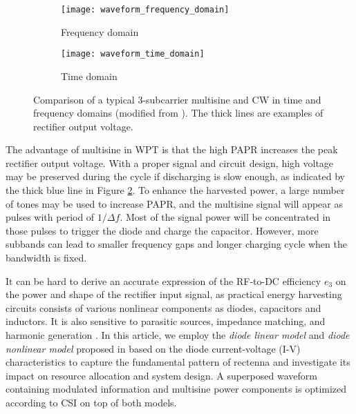 \begin{figure}
  \centering

  \begin{subfigure}{.45\textwidth}
    \centering
      \texttt{[image: waveform\_frequency\_domain]}
    \caption{Frequency domain}
    \label{fig:waveform_frequency_domain}
  \end{subfigure}
  \begin{subfigure}{.45\textwidth}
    \centering
      \texttt{[image: waveform\_time\_domain]}
    \caption{Time domain}
    \label{fig:waveform_time_domain}
  \end{subfigure}

  \caption{Comparison of a typical 3-subcarrier multisine and CW in time and frequency domains (modified from \cite{Trotter2009}). The thick lines are examples of rectifier output voltage.}
  \label{fig:waveform_comparison}
\end{figure}

The advantage of multisine in WPT is that the high PAPR increases the peak rectifier output voltage. With a proper signal and circuit design, high voltage may be preserved during the cycle if discharging is slow enough, as indicated by the thick blue line in Figure \ref{fig:waveform_time_domain}. To enhance the harvested power, a large number of tones may be used to increase PAPR, and the multisine signal will appear as pulses with period of $1/\Delta f$. Most of the signal power will be concentrated in those pulses to trigger the diode and charge the capacitor. However, more subbands can lead to smaller frequency gaps and longer charging cycle when the bandwidth is fixed.

It can be hard to derive an accurate expression of the RF-to-DC efficiency ${e_3}$ on the power and shape of the rectifier input signal, as practical energy harvesting circuits consists of various nonlinear components as diodes, capacitors and inductors. It is also sensitive to parasitic sources, impedance matching, and harmonic generation \cite{Strassner2013, Valenta2014}. In this article, we employ the \textit{diode linear model} and \textit{diode nonlinear model} proposed in \cite{Clerckx2016} based on the diode current-voltage (I-V) characteristics to capture the fundamental pattern of rectenna and investigate its impact on resource allocation and system design. A superposed waveform containing modulated information and multisine power components is optimized according to CSI on top of both models.



